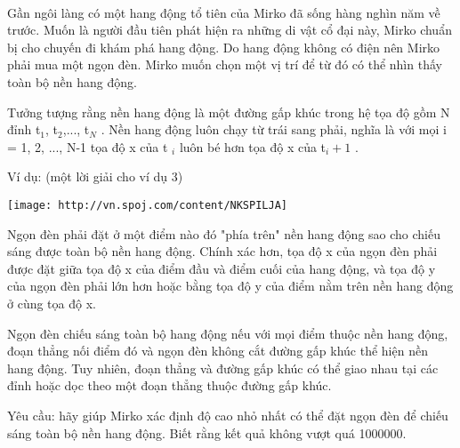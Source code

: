  

Gần ngôi làng có một hang động tổ tiên của Mirko đã sống hàng nghìn năm về trước. Muốn là người đầu tiên phát hiện ra những di vật cổ đại này, Mirko chuẩn bị cho chuyến đi khám phá hang động. Do hang động không có điện nên Mirko phải mua một ngọn đèn. Mirko muốn chọn một vị trí để từ đó có thể nhìn thấy toàn bộ nền hang động.

Tưởng tượng rằng nền hang động là một đường gấp khúc trong hệ tọa độ gồm N đỉnh t$_1$, t$_2$,..., t$_N $ . Nền hang động luôn chạy từ trái sang phải, nghĩa là với mọi i = 1, 2, ..., N-1 tọa độ x của t $_ i $ luôn bé hơn tọa độ x của t$_i+1 $ .

Ví dụ: (một lời giải cho ví dụ 3)


\texttt{[image: http://vn.spoj.com/content/NKSPILJA]}

Ngọn đèn phải đặt ở một điểm nào đó "phía trên" nền hang động sao cho chiếu sáng được toàn bộ nền hang động. Chính xác hơn, tọa độ x của ngọn đèn phải được đặt giữa tọa độ x của điểm đầu và điểm cuối của hang động, và tọa độ y của ngọn đèn phải lớn hơn hoặc bằng tọa độ y của điểm nằm trên nền hang động ở cùng tọa độ x.

Ngọn đèn chiếu sáng toàn bộ hang động nếu với mọi điểm thuộc nền hang động, đoạn thẳng nối điểm đó và ngọn đèn không cắt đường gấp khúc thể hiện nền hang động. Tuy nhiên, đoạn thẳng và đường gấp khúc có thể giao nhau tại các đỉnh hoặc dọc theo một đoạn thẳng thuộc đường gấp khúc.

Yêu cầu: hãy giúp Mirko xác định độ cao nhỏ nhất có thể đặt ngọn đèn để chiếu sáng toàn bộ nền hang động. Biết rằng kết quả không vượt quá 1000000.

\